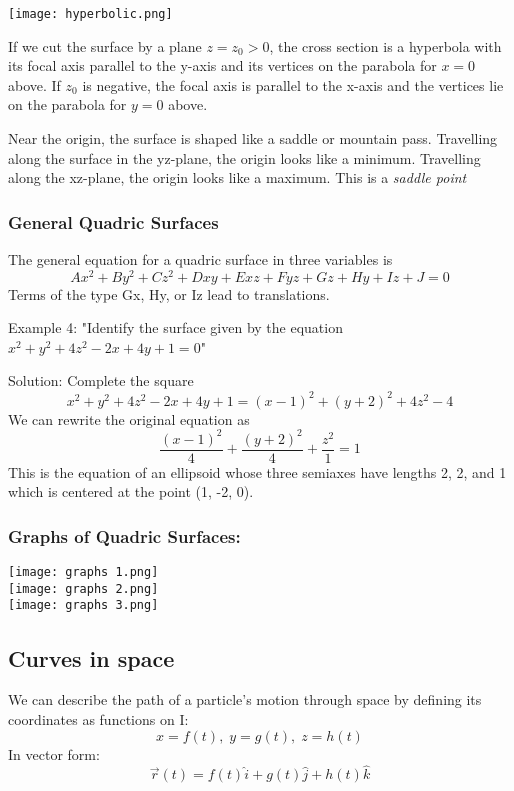 \documentclass[12pt]{article}
\begin{document}
\texttt{[image: hyperbolic.png]}

If we cut the surface by a plane $z = z_0 > 0$, the cross section is a hyperbola with its focal axis parallel to the y-axis and its vertices on the parabola for $x=0$ above. If $z_0$ is negative, the focal axis is parallel to the x-axis and the vertices lie on the parabola for $y = 0$ above. 

Near the origin, the surface is shaped like a saddle or mountain pass. Travelling along the surface in the yz-plane, the origin looks like a minimum. Travelling along the xz-plane, the origin looks like a maximum. This is a \emph{saddle point}

\subsubsection{General Quadric Surfaces}
The general equation for a quadric surface in three variables is 
\[Ax^2 + By^2 + Cz^2 + Dxy + Exz + Fyz + Gz + Hy + Iz + J = 0\]
Terms of the type Gx, Hy, or Iz lead to translations.

Example 4:
"Identify the surface given by the equation $x^2 + y^2 + 4z^2 - 2x + 4y + 1 = 0$"

Solution:
Complete the square
\[x^2 + y^2 + 4z^2 - 2x + 4y + 1 = (x -1)^2 + (y+2)^2 + 4z^2 - 4\]
We can rewrite the original equation as 
\[\frac{(x-1)^2}{4} + \frac{(y+2)^2}{4} + \frac{z^2}{1} =1\]
This is the equation of an ellipsoid whose three semiaxes have lengths 2, 2, and 1 which is centered at the point (1, -2, 0). 

\subsubsection{Graphs of Quadric Surfaces:}
\begin{center}
    \texttt{[image: graphs 1.png]}\\
    \texttt{[image: graphs 2.png]}\\\texttt{[image: graphs 3.png]}\\
\end{center}

\subsection{Curves in space}
We can describe the path of a particle's motion through space by defining its coordinates as functions on I:
\[x=f(t), \; y=g(t),\; z=h(t)\]
In vector form:
\[\vec{r}(t) = f(t) \hat{i} + g(t)\hat{j} + h(t) \hat{k}\]
\end{document}
